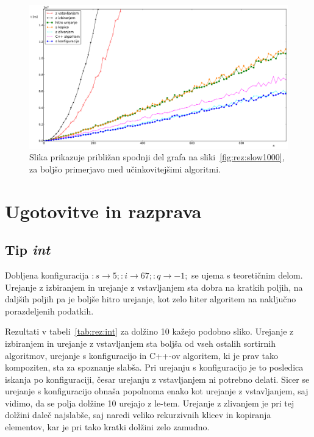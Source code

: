 \documentclass[a4paper,oneside,12pt]{article}
\newcommand{\lra}{\ensuremath{\longrightarrow}}
\begin{document}
\begin{figure}[h!]
    \includegraphics[width=\textwidth]{slike/slow1000zoom.pdf}
    \vspace{-0.7cm}
    \caption[Rezultati za tip \emph{slow}, 1000 el. -- približano]{Slika
    prikazuje približan spodnji del grafa na sliki~\ref{fig:rez:slow1000}, za
    boljšo primerjavo med učinkovitejšimi algoritmi. }
    \label{fig:rez:slowblizu}
\end{figure}

\section{Ugotovitve in razprava}
\subsection{Tip \emph{int}}
Dobljena konfiguracija $:s \lra 5;:i \lra 67;:q \lra -1;$
se ujema s teoretičnim delom. Urejanje z izbiranjem in urejanje z vstavljanjem sta 
dobra na kratkih poljih, na daljših poljih pa je boljše hitro urejanje, kot zelo hiter algoritem na naključno
porazdeljenih podatkih. 

Rezultati v tabeli~\ref{tab:rez:int} za dolžino 10 kažejo podobno sliko. Urejanje z izbiranjem in urejanje 
z vstavljanjem sta boljša od vseh ostalih sortirnih algoritmov, urejanje s konfiguracijo in C++-ov 
algoritem, ki je prav tako kompoziten, sta za spoznanje slabša. Pri urejanju s konfiguracijo je to posledica
iskanja po konfiguraciji, česar urejanju z vstavljanjem ni potrebno delati. Sicer 
se urejanje s konfiguracijo obnaša popolnoma enako kot urejanje z vstavljanjem, saj vidimo, da se polja dolžine 
10 urejajo z le-tem. Urejanje z zlivanjem je pri tej dolžini daleč najslabše, saj naredi veliko 
rekurzivnih klicev in kopiranja elementov, kar je pri tako kratki dolžini zelo zamudno.
\end{document}
